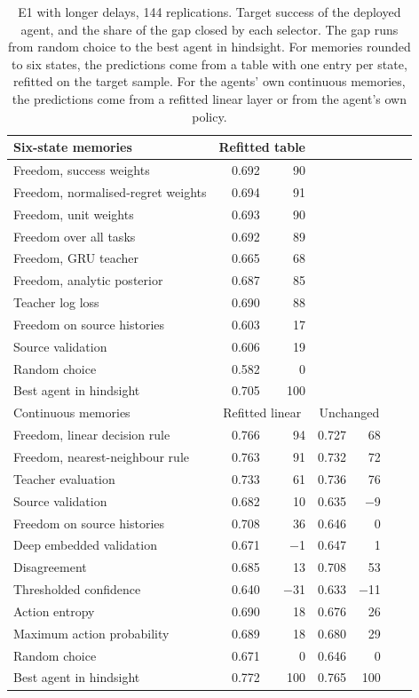 \begin{table}[t]
\centering
\caption{E1 with longer delays, 144 replications. Target success of the deployed agent, and the share of the gap closed by each selector. The gap runs from random choice to the best agent in hindsight. For memories rounded to six states, the predictions come from a table with one entry per state, refitted on the target sample. For the agents' own continuous memories, the predictions come from a refitted linear layer or from the agent's own policy.}
\label{tab:e1}
\small
\begin{tabular}{@{}lrrrrrr@{}}
\toprule
Six-state memories & \multicolumn{2}{c}{Refitted table} & & & & \\
\midrule
Freedom, success weights & 0.692 & 90 & & & & \\
Freedom, normalised-regret weights & 0.694 & 91 & & & & \\
Freedom, unit weights & 0.693 & 90 & & & & \\
Freedom over all tasks & 0.692 & 89 & & & & \\
Freedom, GRU teacher & 0.665 & 68 & & & & \\
Freedom, analytic posterior & 0.687 & 85 & & & & \\
Teacher log loss & 0.690 & 88 & & & & \\
Freedom on source histories & 0.603 & 17 & & & & \\
Source validation & 0.606 & 19 & & & & \\
Random choice & 0.582 & 0 & & & & \\
Best agent in hindsight & 0.705 & 100 & & & & \\
\midrule
Continuous memories & \multicolumn{2}{c}{Refitted linear} & \multicolumn{2}{c}{Unchanged} & & \\
\midrule
Freedom, linear decision rule & 0.766 & 94 & 0.727 & 68 & & \\
Freedom, nearest-neighbour rule & 0.763 & 91 & 0.732 & 72 & & \\
Teacher evaluation & 0.733 & 61 & 0.736 & 76 & & \\
Source validation & 0.682 & 10 & 0.635 & $-$9 & & \\
Freedom on source histories & 0.708 & 36 & 0.646 & 0 & & \\
Deep embedded validation & 0.671 & $-$1 & 0.647 & 1 & & \\
Disagreement & 0.685 & 13 & 0.708 & 53 & & \\
Thresholded confidence & 0.640 & $-$31 & 0.633 & $-$11 & & \\
Action entropy & 0.690 & 18 & 0.676 & 26 & & \\
Maximum action probability & 0.689 & 18 & 0.680 & 29 & & \\
Random choice & 0.671 & 0 & 0.646 & 0 & & \\
Best agent in hindsight & 0.772 & 100 & 0.765 & 100 & & \\
\bottomrule
\end{tabular}
\end{table}

